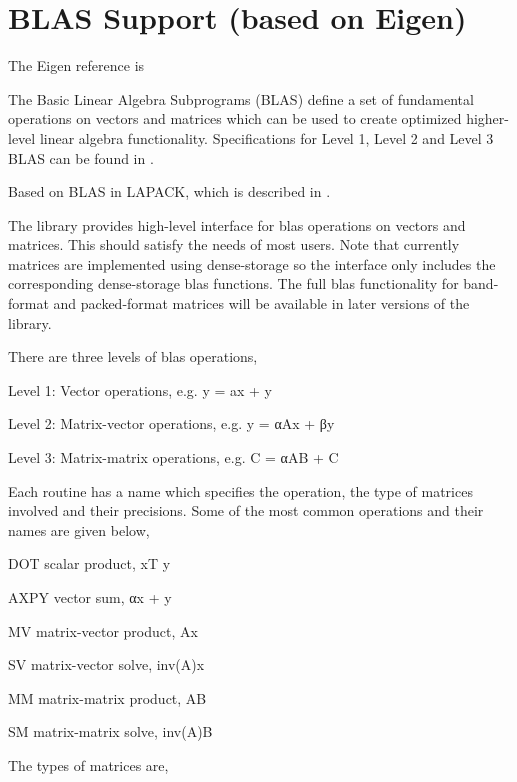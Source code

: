 
\chapter{BLAS Support (based on Eigen)}
\label{BLAS Support} 


The Eigen reference is \cite{Guennebaud2010}


The Basic Linear Algebra Subprograms (BLAS) define a set of fundamental operations on vectors and matrices which can be used to create optimized higher-level linear algebra functionality. 
Specifications for Level 1, Level 2 and Level 3 BLAS can be found in \cite{Lawson_1979, Dongarra_1988, Dongarra_1990}.

Based on BLAS in LAPACK, which is described in \cite{Anderson_1999, Barker_2001}.

\vspace{0.3cm}
The library provides high-level interface for blas operations on vectors and matrices. This should satisfy the needs of most users. Note that currently matrices are implemented using dense-storage so the interface only includes the corresponding dense-storage blas functions. The full blas functionality for band-format and packed-format matrices will be available in later versions of the library. 

\vspace{0.3cm}
There are three levels of blas operations, 

Level 1: Vector operations, e.g. y = ax + y 

Level 2: Matrix-vector operations, e.g. y = αAx + βy 

Level 3: Matrix-matrix operations, e.g. C = αAB + C 

\vspace{0.3cm}
Each routine has a name which specifies the operation, the type of matrices involved and their precisions. Some of the most common operations and their names are given below, 

\vspace{0.3cm}
DOT scalar product, xT y 

AXPY vector sum, αx + y 

MV matrix-vector product, Ax 

SV matrix-vector solve, inv(A)x 

MM matrix-matrix product, AB 

SM matrix-matrix solve, inv(A)B 

\vspace{0.3cm}
The types of matrices are, 

